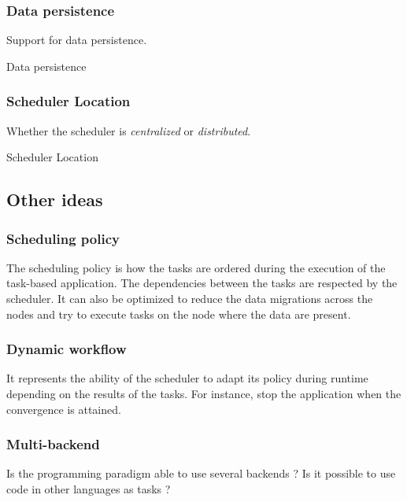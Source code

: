 \subsubsection{Data persistence}
Support for data persistence.
\begin{table}[H]
	\caption{Data persistence}
	\centering
	
\end{table}

\subsubsection{Scheduler Location}
Whether the scheduler is \textit{centralized} or \textit{distributed}.
\begin{table}[H]
	\caption{Scheduler Location}
	\centering
	
\end{table}

%	


\subsection{Other ideas}
\subsubsection{Scheduling policy}
The scheduling policy is how the tasks are ordered during the execution of the task-based application.
The dependencies between the tasks are respected by the scheduler.
It can also be optimized to reduce the data migrations across the nodes and try to execute tasks on the node where the data are present.

\subsubsection{Dynamic workflow}
It represents the ability of the scheduler to adapt its policy during runtime depending on the results of the tasks.
For instance, stop the application when the convergence is attained.


\subsubsection{Multi-backend}
Is the programming paradigm able to use several backends ?
Is it possible to use code in other languages as tasks ?


